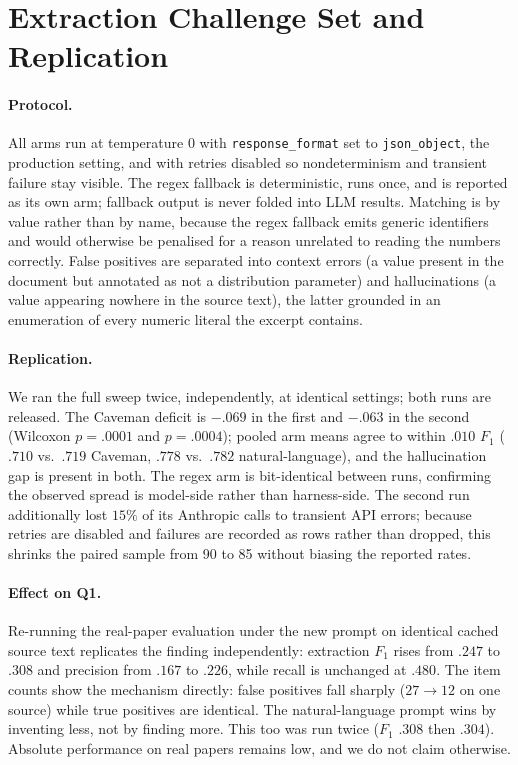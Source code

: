 \section{Extraction Challenge Set and Replication}
\label{app:extraction}

\paragraph{Protocol.} All arms run at temperature $0$ with
\texttt{response\_format} set to \texttt{json\_object}, the production setting,
and with retries disabled so nondeterminism and transient failure stay visible.
The regex fallback is deterministic, runs once, and is reported as its own arm;
fallback output is never folded into LLM results. Matching is by value rather
than by name, because the regex fallback emits generic identifiers and would
otherwise be penalised for a reason unrelated to reading the numbers correctly.
False positives are separated into context errors (a value present in the
document but annotated as not a distribution parameter) and hallucinations (a
value appearing nowhere in the source text), the latter grounded in an
enumeration of every numeric literal the excerpt contains.

\paragraph{Replication.} We ran the full sweep twice, independently, at identical
settings; both runs are released. The Caveman deficit is $-.069$ in the first and
$-.063$ in the second (Wilcoxon $p=.0001$ and $p=.0004$); pooled arm means agree
to within $.010$ $F_1$ ($.710$ vs.\ $.719$ Caveman, $.778$ vs.\ $.782$
natural-language), and the hallucination gap is present in both. The regex arm is
bit-identical between runs, confirming the observed spread is model-side rather
than harness-side. The second run additionally lost $15\%$ of its Anthropic calls
to transient API errors; because retries are disabled and failures are recorded
as rows rather than dropped, this shrinks the paired sample from 90 to 85 without
biasing the reported rates.

\paragraph{Effect on Q1.} Re-running the real-paper evaluation under the new
prompt on identical cached source text replicates the finding independently:
extraction $F_1$ rises from $.247$ to $.308$ and precision from $.167$ to $.226$,
while recall is unchanged at $.480$. The item counts show the mechanism directly:
false positives fall sharply ($27 \rightarrow 12$ on one source) while true
positives are identical. The natural-language prompt wins by inventing less, not
by finding more. This too was run twice ($F_1$ $.308$ then $.304$). Absolute
performance on real papers remains low, and we do not claim otherwise.

